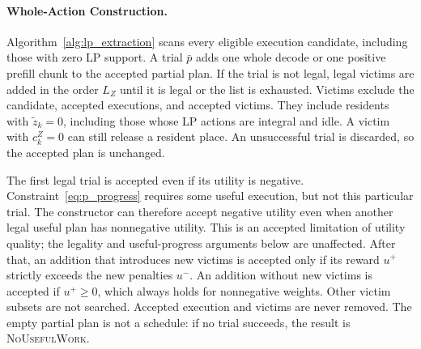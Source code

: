 \documentclass[11pt]{article}
\begin{document}
\paragraph{Whole-Action Construction.}
Algorithm~\ref{alg:lp_extraction} scans every eligible execution candidate, including those with zero LP support. A trial \(\bar p\) adds one whole decode or one positive prefill chunk to the accepted partial plan. If the trial is not legal, legal victims are added in the order \(L_Z\) until it is legal or the list is exhausted. Victims exclude the candidate, accepted executions, and accepted victims. They include residents with \(\tilde z_k=0\), including those whose LP actions are integral and idle. A victim with \(c_k^Z=0\) can still release a resident place. An unsuccessful trial is discarded, so the accepted plan is unchanged.

The first legal trial is accepted even if its utility is negative. Constraint~\ref{eq:p_progress} requires some useful execution, but not this particular trial. The constructor can therefore accept negative utility even when another legal useful plan has nonnegative utility. This is an accepted limitation of utility quality; the legality and useful-progress arguments below are unaffected. After that, an addition that introduces new victims is accepted only if its reward \(u^+\) strictly exceeds the new penalties \(u^-\). An addition without new victims is accepted if \(u^+\ge0\), which always holds for nonnegative weights. Other victim subsets are not searched. Accepted execution and victims are never removed. The empty partial plan is not a schedule: if no trial succeeds, the result is \textsc{NoUsefulWork}.
\end{document}
